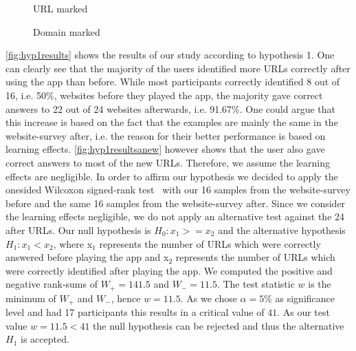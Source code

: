 \begin{figure}
\centering
{}
\caption{URL marked}
\label{fig:hyp2results}
\end{figure}

\begin{figure}
\centering
{}
\caption{Domain marked}
\label{fig:hyp3results}
\end{figure}

\begin{description}[leftmargin=0cm]
\item[Hypothesis 1:]
\autoref{fig:hyp1results} shows the results of our study according to hypothesis 1. One can clearly see that the majority of the users identified more URLs correctly after using the app than before. While most participants correctly identified 8 out of 16, i.e. 50\%, websites before they played the app, the majority gave correct answers to 22 out of 24 websites afterwards, i.e. 91.67\%. One could argue that this increase is based on the fact that the examples are mainly the same in the website-survey after, i.e. the reason for their better performance is based on learning effects. \autoref{fig:hyp1resultsanew} however shows that the user also gave correct answers to most of the new URLs. Therefore, we assume the learning effects are negligible.
In order to affirm our hypothesis we decided to apply the onesided Wilcoxon signed-rank test~\cite{wilcoxon1945individual} with our 16 samples from the website-survey before and the same 16 samples from the website-survey after.
Since we consider the learning effects negligible, we do not apply an alternative test against the 24 after URLs.
Our null hypothesis is $H_{0}: x_{1} >= x_{2}$ and the alternative hypothesis $H_{1}: x_{1} < x_{2}$, where x$_{1}$ represents the number of URLs which were correctly answered before playing the app and x$_{2}$ represents the number of URLs which were correctly identified after playing the app.
We computed the positive and negative rank-sums of $W_{+} = 141.5$ and $W_{-} = 11.5$.
The test statistic $w$ is the minimum of $W_{+}$ and $W_{-}$, hence $w = 11.5$.
As we chose $\alpha = 5\%$ as significance level and had 17 participants this results in a critical value of $41$.
As our test value $w = 11.5 < 41$ the null hypothesis can be rejected and thus the alternative $H_{1}$ is accepted.

\end{description}
